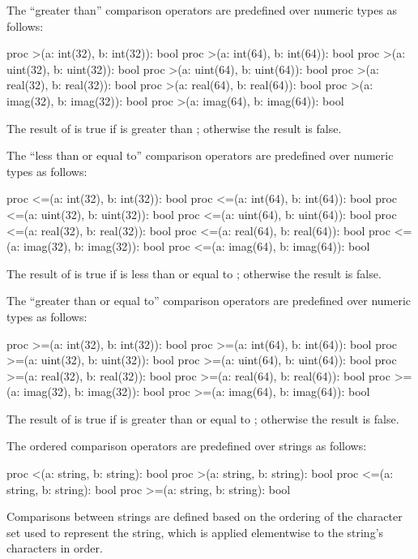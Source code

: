 The ``greater than'' comparison operators are predefined over numeric
types as follows:
\begin{chapel}
proc >(a: int(32), b: int(32)): bool
proc >(a: int(64), b: int(64)): bool
proc >(a: uint(32), b: uint(32)): bool
proc >(a: uint(64), b: uint(64)): bool
proc >(a: real(32), b: real(32)): bool
proc >(a: real(64), b: real(64)): bool
proc >(a: imag(32), b: imag(32)): bool
proc >(a: imag(64), b: imag(64)): bool
\end{chapel}
The result of  is true if  is greater
than ; otherwise the result is false.

The ``less than or equal to'' comparison operators are predefined over
numeric types as follows:
\begin{chapel}
proc <=(a: int(32), b: int(32)): bool
proc <=(a: int(64), b: int(64)): bool
proc <=(a: uint(32), b: uint(32)): bool
proc <=(a: uint(64), b: uint(64)): bool
proc <=(a: real(32), b: real(32)): bool
proc <=(a: real(64), b: real(64)): bool
proc <=(a: imag(32), b: imag(32)): bool
proc <=(a: imag(64), b: imag(64)): bool
\end{chapel}
The result of  is true if  is less than or equal
to ; otherwise the result is false.

The ``greater than or equal to'' comparison operators are predefined
over numeric types as follows:
\begin{chapel}
proc >=(a: int(32), b: int(32)): bool
proc >=(a: int(64), b: int(64)): bool
proc >=(a: uint(32), b: uint(32)): bool
proc >=(a: uint(64), b: uint(64)): bool
proc >=(a: real(32), b: real(32)): bool
proc >=(a: real(64), b: real(64)): bool
proc >=(a: imag(32), b: imag(32)): bool
proc >=(a: imag(64), b: imag(64)): bool
\end{chapel}
The result of  is true if  is greater than or
equal to ; otherwise the result is false.

The ordered comparison operators are predefined over strings as follows:
\begin{chapel}
proc <(a: string, b: string): bool
proc >(a: string, b: string): bool
proc <=(a: string, b: string): bool
proc >=(a: string, b: string): bool
\end{chapel}
Comparisons between strings are defined based on the ordering of the
character set used to represent the string, which is applied
elementwise to the string's characters in order.


